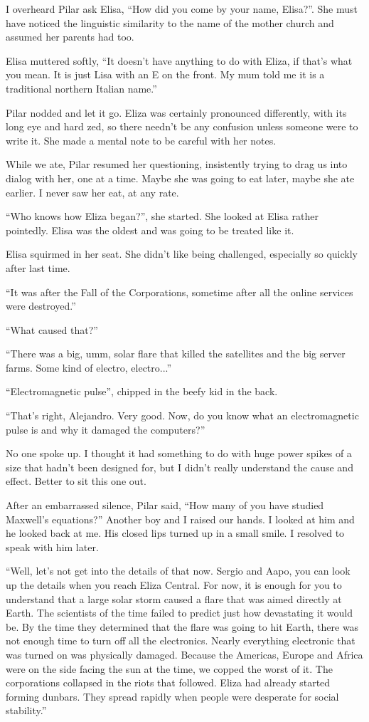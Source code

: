 I overheard Pilar ask Elisa, ``How did you come by your name, Elisa?''. She must have noticed the linguistic similarity to the name of the mother church and assumed her parents had too.

Elisa muttered softly, ``It doesn't have anything to do with Eliza, if that's what you mean. It is just Lisa with an E on the front. My mum told me it is a traditional northern Italian name.''

Pilar nodded and let it go. Eliza was certainly pronounced differently, with its long eye and hard zed, so there needn't be any confusion unless someone were to write it. She made a mental note to be careful with her notes.

While we ate, Pilar resumed her questioning, insistently trying to drag us into dialog with her, one at a time. Maybe she was going to eat later, maybe she ate earlier. I never saw her eat, at any rate.

``Who knows how Eliza began?'', she started. She looked at Elisa rather pointedly. Elisa was the oldest and was going to be treated like it.

Elisa squirmed in her seat. She didn't like being challenged, especially so quickly after last time.

``It was after the Fall of the Corporations, sometime after all the online services were destroyed.''

``What caused that?''

``There was a big, umm, solar flare that killed the satellites and the big server farms. Some kind of electro, electro...''

``Electromagnetic pulse'', chipped in the beefy kid in the back. 

``That's right, Alejandro. Very good. Now, do you know what an electromagnetic pulse is and why it damaged the computers?''

No one spoke up. I thought it had something to do with huge power spikes of a size that hadn't been designed for, but I didn't really understand the cause and effect. Better to sit this one out.

After an embarrassed silence, Pilar said, ``How many of you have studied Maxwell's equations?'' Another boy and I raised our hands. I looked at him and he looked back at me. His closed lips turned up in a small smile. I resolved to speak with him later.

``Well, let's not get into the details of that now. Sergio and Aapo, you can look up the details when you reach Eliza Central. For now, it is enough for you to understand that a large solar storm caused a flare that was aimed directly at Earth. The scientists of the time failed to predict just how devastating it would be. By the time they determined that the flare was going to hit Earth, there was not enough time to turn off all the electronics. Nearly everything electronic that was turned on was physically damaged. Because the Americas, Europe and Africa were on the side facing the sun at the time, we copped the worst of it. The corporations collapsed in the riots that followed. Eliza had already started forming dunbars. They spread rapidly when people were desperate for social stability.''

